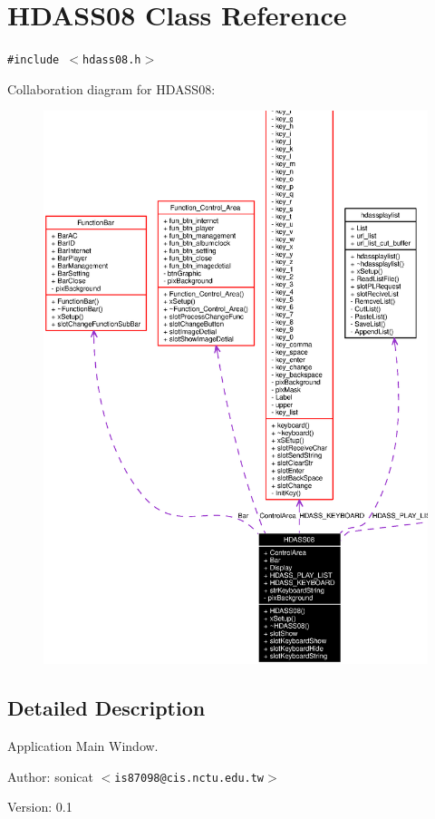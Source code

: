 \section{HDASS08 Class Reference}
\label{classHDASS08}
{\tt \#include $<$hdass08.h$>$}

Collaboration diagram for HDASS08:\begin{figure}[H]
\begin{center}
\leavevmode
\includegraphics[width=364pt]{classHDASS08__coll__graph}
\end{center}
\end{figure}


\subsection{Detailed Description}
Application Main Window. 

\begin{Desc}
\item[Author:]sonicat $<${\tt is87098@cis.nctu.edu.tw}$>$ \end{Desc}
\begin{Desc}
\item[Version:]0.1 \end{Desc}




